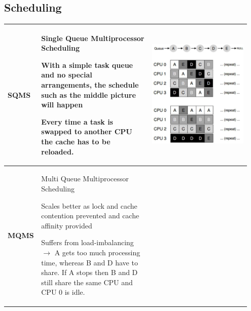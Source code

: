 	\subsection{Scheduling}
		\begin{longtable}{|>{\bfseries}p{0.1\linewidth}|p{0.45\linewidth}|p{0.4\linewidth}|}
			\hline
			SQMS
			&
				\begin{compactitem}
					\item Single Queue Multiprocessor Scheduling
					\item With a simple task queue and no special arrangements, the schedule such as the middle picture will happen
					\item Every time a task is swapped to another CPU the cache has to be reloaded.
				\end{compactitem}
			&
			\vspace{0pt}
			
			\includegraphics[width=\linewidth]{./pictures/sqms.png} \\
			\hline
			MQMS
			&
			\begin{compactitem}
				\item Multi Queue Multiprocessor Scheduling
				\item Scales better as lock and cache contention prevented and cache affinity provided
				\item Suffers from load-imbalancing $\rightarrow$ A gets too much processing time, whereas B and D have to share. If A stops then B and D still share the same CPU and CPU 0 is idle.
			\end{compactitem}
			&
			\vspace{0pt}
			

\end{longtable}
